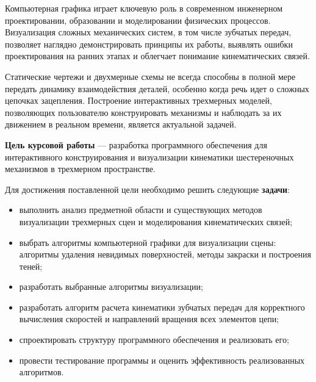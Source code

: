 
Компьютерная графика играет ключевую роль в современном инженерном проектировании, образовании и моделировании физических процессов. Визуализация сложных механических систем, в том числе зубчатых передач, позволяет наглядно демонстрировать принципы их работы, выявлять ошибки проектирования на ранних этапах и облегчает понимание кинематических связей.

Статические чертежи и двухмерные схемы не всегда способны в полной мере передать динамику взаимодействия деталей, особенно когда речь идет о сложных цепочках зацепления. Построение интерактивных трехмерных моделей, позволяющих пользователю конструировать механизмы и наблюдать за их движением в реальном времени, является актуальной задачей.

\textbf{Цель курсовой работы} --- разработка программного обеспечения для интерактивного конструирования и визуализации кинематики шестереночных механизмов в трехмерном пространстве.

Для достижения поставленной цели необходимо решить следующие \textbf{задачи}:

\begin{itemize}
	\item выполнить анализ предметной области и существующих методов визуализации трехмерных сцен и моделирования кинематических связей;
	\item выбрать алгоритмы компьютерной графики для визуализации сцены: алгоритмы удаления невидимых поверхностей, методы закраски и построения теней;
	\item разработать выбранные алгоритмы визуализации;
	\item разработать алгоритм расчета кинематики зубчатых передач для корректного вычисления скоростей и направлений вращения всех элементов цепи;
	\item спроектировать структуру программного обеспечения и реализовать его;
	\item провести тестирование программы и оценить эффективность реализованных алгоритмов.
\end{itemize}
